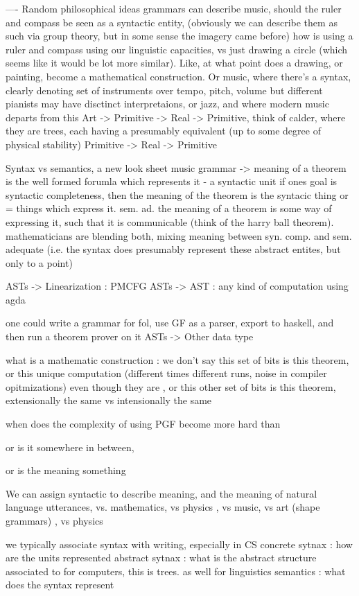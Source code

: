 ---- Random philosophical ideas
grammars can describe music, 
should the ruler and compass be seen as a syntactic entity, (obviously we can
describe them as such via group theory, but in some sense the imagery came before)
how is using a ruler and compass using our linguistic capacities, vs just
drawing a circle (which seems like it would be lot more similar).  Like, at what
point does a drawing, or painting, become a mathematical construction. Or music,
where there's a syntax, clearly denoting set of instruments over { tempo, pitch,
  volume } but different pianists may have disctinct interpretaions, or jazz,
and where modern music departs from this 
Art ->
Primitive -> Real -> Primitive, think of calder, where they are trees, each
having a presumably equivalent (up to some degree of physical stability)
Primitive -> Real -> Primitive 

Syntax vs semantics, a new look
sheet music grammar -> 
meaning of a theorem is the well formed forumla which represents it - a
syntactic unit 
if ones goal is syntactic completeness, then the meaning of the theorem is the
syntacic thing or {= things} which express it.
sem. ad. the meaning of a theorem is some way of expressing it, such that it is
communicable  (think of the harry ball theorem). mathematicians are blending
both, mixing meaning between syn. comp. and sem. adequate (i.e. the syntax does
presumably represent these abstract entites, but only to a point)

ASTs -> Linearization : PMCFG
ASTs -> AST : any kind of computation using agda

one could write a grammar for fol, use GF as a parser, export to haskell, and
then run a theorem prover on it
ASTs -> Other data type

what is a mathematic construction : we don't say this set of bits is this
theorem, or this unique computation (different times different runs, noise in
compiler opitmizations) even though they are , or this other set of bits is this theorem, 
extensionally the same vs intensionally the same

when does the complexity of using PGF become more hard than 

or is it somewhere in between, 

or is the meaning something

We can assign syntactic to describe meaning, and the meaning of natural language
utterances, vs. mathematics, vs physics , vs music, vs art (shape grammars) , vs physics

we typically associate syntax with writing, especially in CS
concrete sytnax : how are the units represented 
abstract sytnax : what is the abstract structure associated to 
  for computers, this is trees. as well for linguistics
semantics : what does the syntax represent 

